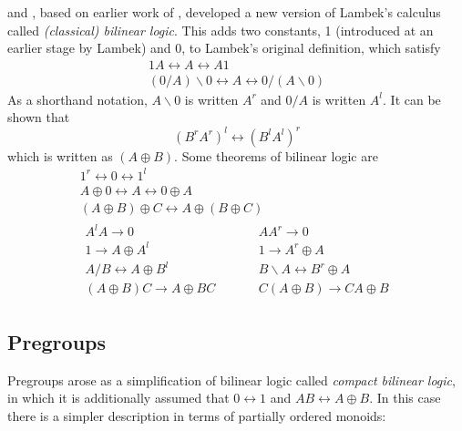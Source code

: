 \documentclass[12pt]{report}
\begin{document}
\cite{Lambek:93} and \cite{Abrusci:91}, based on earlier work of \cite{Girard:87}, developed a new version of Lambek's calculus called \emph{(classical) bilinear logic}. This adds two constants, 1 (introduced at an earlier stage by Lambek) and 0, to Lambek's original definition, which satisfy
\begin{gather*}
1A \leftrightarrow A \leftrightarrow A1\\
(0/A)\backslash 0 \leftrightarrow A \leftrightarrow 0/(A\backslash 0) 
\end{gather*}
As a shorthand notation, $A\backslash 0$ is written $A^r$ and $0/A$ is written $A^l$. It can be shown that
$$(B^rA^r)^l \leftrightarrow  (B^lA^l)^r$$
which is written as $(A\oplus B)$. Some theorems of bilinear logic \citep{Casadio:02} are
\begin{gather*}
1^r \leftrightarrow 0 \leftrightarrow 1^l\\
A\oplus 0 \leftrightarrow A \leftrightarrow 0\oplus A\\
(A\oplus B)\oplus C \leftrightarrow A\oplus(B\oplus C)\\
\begin{aligned}
A^lA \rightarrow 0& &\quad &AA^r \rightarrow 0\\
1 \rightarrow A\oplus A^l& & &1 \rightarrow A^r\oplus A\\
A/B  \leftrightarrow A\oplus B^l& & &B \backslash A \leftrightarrow B^r \oplus A\\
(A\oplus B) C  \rightarrow A\oplus BC& & &C(A\oplus B)  \rightarrow CA\oplus B
\end{aligned}
\end{gather*}

\subsection{Pregroups}

Pregroups \citep{Lambek:01} arose as a simplification of bilinear logic called \emph{compact bilinear logic}, in which it is additionally assumed that $0 \leftrightarrow 1$ and $AB \leftrightarrow A\oplus B$. In this case there is a simpler description in terms of partially ordered monoids:
\end{document}

